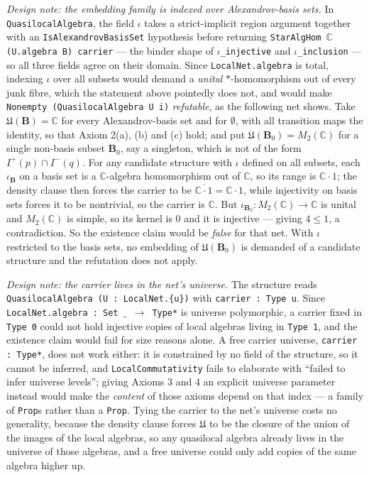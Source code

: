 \begin{theorem}
    \emph{Design note: the embedding family is indexed over Alexandrov-basis sets.} In \texttt{QuasilocalAlgebra}, the field \texttt{\ensuremath{\iota}} takes a strict-implicit region argument together with an \texttt{IsAlexandrovBasisSet} hypothesis before returning \texttt{StarAlgHom \ensuremath{\mathbb{C}} (U.algebra B) carrier} --- the binder shape of \texttt{\ensuremath{\iota}\_injective} and \texttt{\ensuremath{\iota}\_inclusion} --- so all three fields agree on their domain. Since \texttt{LocalNet.algebra} is total, indexing \texttt{\ensuremath{\iota}} over all subsets would demand a \emph{unital} $*$-homomorphism out of every junk fibre, which the statement above pointedly does not, and would make \texttt{Nonempty (QuasilocalAlgebra U i)} \emph{refutable}, as the following net shows. Take $\mathfrak{U}(\mathbf{B}) = \mathbb{C}$ for every Alexandrov-basis set and for $\emptyset$, with all transition maps the identity, so that Axiom 2(a), (b) and (c) hold; and put $\mathfrak{U}(\mathbf{B}_0) = M_2(\mathbb{C})$ for a single non-basis subset $\mathbf{B}_0$, say a singleton, which is not of the form $I^+(p) \cap I^-(q)$. For any candidate structure with \texttt{\ensuremath{\iota}} defined on all subsets, each $\iota_{\mathbf{B}}$ on a basis set is a $\mathbb{C}$-algebra homomorphism out of $\mathbb{C}$, so its range is $\mathbb{C}\cdot 1$; the density clause then forces the carrier to be $\overline{\mathbb{C}\cdot 1} = \mathbb{C}\cdot 1$, while injectivity on basis sets forces it to be nontrivial, so the carrier is $\mathbb{C}$. But $\iota_{\mathbf{B}_0} : M_2(\mathbb{C}) \to \mathbb{C}$ is unital and $M_2(\mathbb{C})$ is simple, so its kernel is $0$ and it is injective --- giving $4 \le 1$, a contradiction. So the existence claim would be \emph{false} for that net. With \texttt{\ensuremath{\iota}} restricted to the basis sets, no embedding of $\mathfrak{U}(\mathbf{B}_0)$ is demanded of a candidate structure and the refutation does not apply.

    \emph{Design note: the carrier lives in the net's universe.} The structure reads \texttt{QuasilocalAlgebra (U : LocalNet.\{u\})} with \texttt{carrier : Type u}. Since \texttt{LocalNet.algebra : Set \ensuremath{\_} \ensuremath{\rightarrow} Type*} is universe polymorphic, a carrier fixed in \texttt{Type 0} could not hold injective copies of local algebras living in \texttt{Type 1}, and the existence claim would fail for size reasons alone. A free carrier universe, \texttt{carrier : Type*}, does not work either: it is constrained by no field of the structure, so it cannot be inferred, and \texttt{LocalCommutativity} fails to elaborate with ``failed to infer universe levels''; giving Axioms 3 and 4 an explicit universe parameter instead would make the \emph{content} of those axioms depend on that index --- a family of \texttt{Prop}s rather than a \texttt{Prop}. Tying the carrier to the net's universe costs no generality, because the density clause forces $\mathfrak{U}$ to be the closure of the union of the images of the local algebras, so any quasilocal algebra already lives in the universe of those algebras, and a free universe could only add copies of the same algebra higher up.


\end{theorem}
